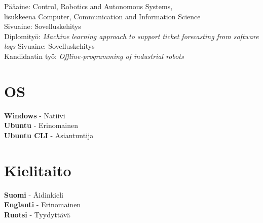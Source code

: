 \documentclass[letterpaper]{twentysecondcv}
\begin{document}
\begin{twenty} %
  {Pääaine: Control, Robotics and Autonomous Systems, \\
  lisukkeena Computer, Communication and Information Science \\
  Sivuaine: Sovelluskehitys \\
  Diplomityö: \emph{Machine learning approach to support ticket forecasting from software logs}}
  {Sivuaine: Sovelluskehitys \\
	Kandidaatin työ: \emph{Offline-programming of industrial robots}}
\end{twenty}




\begin{minipage}[t]{0.5\textwidth}
  \vspace{-\baselineskip} %

  \section{OS}

  \textbf{Windows} - Natiivi \\
  \textbf{Ubuntu} - Erinomainen \\
  \textbf{Ubuntu CLI} - Asiantuntija


\end{minipage}
\hfill
\begin{minipage}[t]{0.5\textwidth}
  \vspace{-\baselineskip} %

  \section{Kielitaito}

  \textbf{Suomi} - Äidinkieli \\
  \textbf{Englanti} - Erinomainen \\
  \textbf{Ruotsi} - Tyydyttävä \\

\end{minipage}
\end{document}
